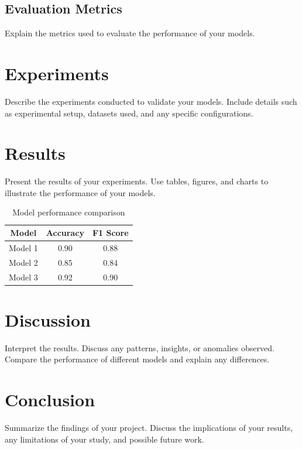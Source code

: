 \documentclass{article}
\begin{document}
\subsection{Evaluation Metrics}
Explain the metrics used to evaluate the performance of your models.

\section{Experiments}
\label{sec:experiments}
Describe the experiments conducted to validate your models. Include details such as experimental setup, datasets used, and any specific configurations.

\section{Results}
\label{sec:results}
Present the results of your experiments. Use tables, figures, and charts to illustrate the performance of your models.

\begin{table}[ht]
    \centering
    \begin{tabular}{|c|c|c|}
        \hline
        Model & Accuracy & F1 Score \\
        \hline
        Model 1 & 0.90 & 0.88 \\
        Model 2 & 0.85 & 0.84 \\
        Model 3 & 0.92 & 0.90 \\
        \hline
    \end{tabular}
    \caption{Model performance comparison}
    \label{tab:results}
\end{table}

\section{Discussion}
\label{sec:discussion}
Interpret the results. Discuss any patterns, insights, or anomalies observed. Compare the performance of different models and explain any differences.

\section{Conclusion}
\label{sec:conclusion}
Summarize the findings of your project. Discuss the implications of your results, any limitations of your study, and possible future work.
\end{document}
